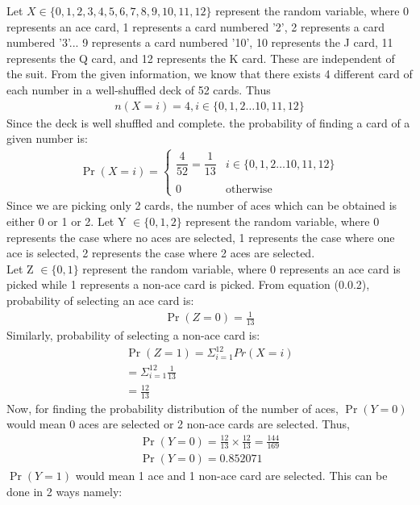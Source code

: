 \documentclass[journal,12pt,twocolumn]{IEEEtran}
\begin{document}
Let $X \in \{0,1,2,3,4,5,6,7,8,9,10,11,12\}$ represent the random variable, where 0 represents an ace card, 1 represents a card numbered '2', 2 represents a card numbered '3'... 9 represents a card numbered '10', 10 represents the J card, 11 represents the Q card, and 12 represents the K card. These are independent of the suit. From the given information, we know that there exists 4 different card of each number in a well-shuffled deck of 52 cards. Thus
\begin{align}
    n(X=i) = 4, i \in \{0, 1, 2\hdots 10, 11, 12\}
\end{align}
Since the deck is well shuffled and complete. the probability of finding a card of a given number is:
\begin{align}
    \Pr(X=i) = 
	\begin{cases}
	\dfrac{4}{52} = \dfrac{1}{13} &  i \in \{0, 1, 2\hdots 10, 11, 12\}\\ ~\\[-1em]
	0 & \text{otherwise}
	\end{cases}
\end{align}
Since we are picking only 2 cards, the number of aces which can be obtained is either 0 or 1 or 2. Let Y $\in \{0,1,2\}$ represent the random variable, where 0 represents the case where no aces are selected, 1 represents the case where one ace is selected, 2 represents the case where 2 aces are selected.
\\Let Z $\in \{0,1\}$ represent the random variable, where 0 represents an ace card is picked while 1 represents a non-ace card is picked.
From equation (0.0.2), probability of selecting an ace card is:
\begin{align}
    \Pr(Z=0) = \frac{1}{13}
\end{align}
Similarly, probability of selecting a non-ace card is:
\begin{align}
    \Pr(Z=1) = \Sigma_{i=1}^{12} Pr(X=i)
    \\ = \Sigma_{i=1}^{12}\frac{1}{13}
    \\ = \frac{12}{13}
\end{align}
Now, for finding the probability distribution of the number of aces, $\Pr(Y=0)$ would mean 0 aces are selected or 2 non-ace cards are selected. Thus,
\begin{align}
    \Pr(Y=0) = \frac{12}{13} \times \frac{12}{13} = \frac{144}{169}
    \\\Pr(Y=0) = 0.852071
\end{align}
$\Pr(Y=1)$ would mean 1 ace and 1 non-ace card are selected. This can be done in 2 ways namely: 
\end{document}
